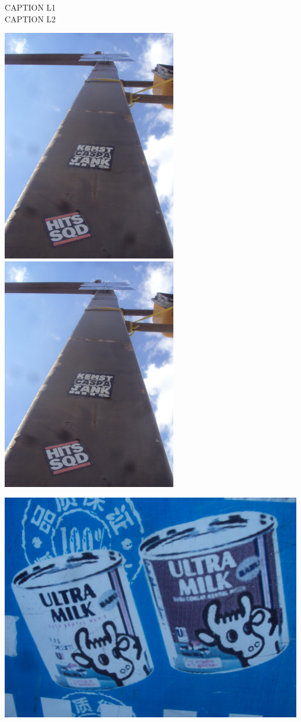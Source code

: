 \documentclass[10pt,letterpaper]{article}
\begin{document}
CAPTION L1\\
CAPTION L2\\
\pagebreak

\includegraphics[height=4in]{portrait.jpg}
\includegraphics[height=4in]{portrait.jpg}

\vspace{0.25in}
\includegraphics[width=5.19in]{landscape.jpg}
\end{document}
